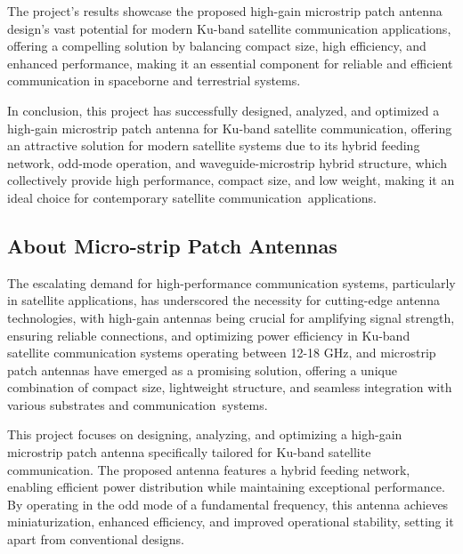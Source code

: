 \documentclass[12pt]{article}
\begin{document}
\par The project's results showcase the proposed high-gain microstrip patch antenna design's vast potential for modern Ku-band satellite communication applications, offering a compelling solution by balancing compact size, high efficiency, and enhanced performance, making it an essential component for reliable and efficient communication in spaceborne and terrestrial systems.\\

\par In conclusion, this project has successfully designed, analyzed, and optimized a high-gain microstrip patch antenna for Ku-band satellite communication, offering an attractive solution for modern satellite systems due to its hybrid feeding network, odd-mode operation, and waveguide-microstrip hybrid structure, which collectively provide high performance, compact size, and low weight, making it an ideal choice for contemporary satellite communication applications.\\


\newpage
\subsection{About Micro-strip Patch Antennas}
\par The escalating demand for high-performance communication systems, particularly in satellite applications, has underscored the necessity for cutting-edge antenna technologies, with high-gain antennas being crucial for amplifying signal strength, ensuring reliable connections, and optimizing power efficiency in Ku-band satellite communication systems operating between 12-18 GHz, and microstrip patch antennas have emerged as a promising solution, offering a unique combination of compact size, lightweight structure, and seamless integration with various substrates and communication systems.\\

\par This project focuses on designing, analyzing, and optimizing a high-gain microstrip patch antenna specifically tailored for Ku-band satellite communication. The proposed antenna features a hybrid feeding network, enabling efficient power distribution while maintaining exceptional performance. By operating in the odd mode of a fundamental frequency, this antenna achieves miniaturization, enhanced efficiency, and improved operational stability, setting it apart from conventional designs.\\
\end{document}
